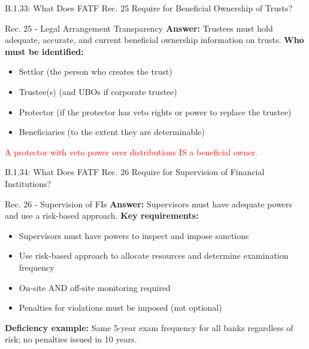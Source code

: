 \documentclass{beamer}
\begin{document}
	\begin{frame}{B.1.33: What Does FATF Rec. 25 Require for Beneficial Ownership of Trusts?}
		\begin{block}{Rec. 25 - Legal Arrangement Transparency}
			\textbf{Answer:} Trustees must hold adequate, accurate, and current beneficial ownership information on trusts.
			\vspace{0.2cm}
			\textbf{Who must be identified:}
			\begin{itemize}
				\item Settlor (the person who creates the trust)
				\item Trustee(s) (and UBOs if corporate trustee)
				\item Protector (if the protector has veto rights or power to replace the trustee)
				\item Beneficiaries (to the extent they are determinable)
			\end{itemize}
			\textcolor{red}{A protector with veto power over distributions IS a beneficial owner.}
		\end{block}
	\end{frame}
	
	\begin{frame}{B.1.34: What Does FATF Rec. 26 Require for Supervision of Financial Institutions?}
		\begin{block}{Rec. 26 - Supervision of FIs}
			\textbf{Answer:} Supervisors must have adequate powers and use a risk-based approach.
			\vspace{0.2cm}
			\textbf{Key requirements:}
			\begin{itemize}
				\item Supervisors must have powers to inspect and impose sanctions
				\item Use risk-based approach to allocate resources and determine examination frequency
				\item On-site AND off-site monitoring required
				\item Penalties for violations must be imposed (not optional)
			\end{itemize}
			\textbf{Deficiency example:} Same 5-year exam frequency for all banks regardless of risk; no penalties issued in 10 years.
		\end{block}
	\end{frame}
	
\end{document}
